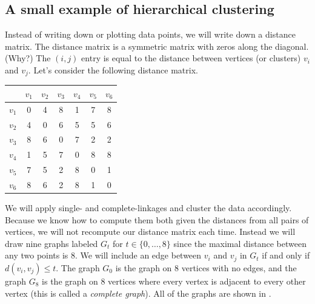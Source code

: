 \documentclass[a4paper, 12pt]{article}
\numberwithin{equation}{section}
\numberwithin{figure}{section}
\theoremstyle{definition}
\renewcommand{\leq}{\leqslant}
\begin{document}
\subsection{A small example of hierarchical clustering}

Instead of writing down or plotting data points, we will write down a distance
matrix. The distance matrix is a symmetric matrix with zeros along the diagonal.
(Why?) The $(i,j)$ entry is equal to the distance between vertices (or clusters)
$v_i$ and $v_j$. Let's consider the following distance matrix.
\begin{center}
	\begin{tabular}{c|cccccc}
		& $v_1$ & $v_2$ & $v_3$ & $v_4$ & $v_5$ & $v_6$ \\ \hline 
		$v_1$ & 0 & 4 & 8 & 1 & 7 & 8 \\
		$v_2$ & 4 & 0 & 6 & 5 & 5 & 6 \\
		$v_3$ & 8 & 6 & 0 & 7 & 2 & 2 \\
		$v_4$ & 1 & 5 & 7 & 0 & 8 & 8 \\
		$v_5$ & 7 & 5 & 2 & 8 & 0 & 1 \\
		$v_6$ & 8 & 6 & 2 & 8 & 1 & 0 
	\end{tabular}
\end{center}

We will apply single- and complete-linkages and cluster the data accordingly.
Because we know how to compute them both given the distances from all pairs of
vertices, we will not recompute our distance matrix each time. Instead we will
draw nine graphs labeled $G_t$ for $t\in \{0, \dots, 8\}$ since the maximal
distance between any two points is $8$. We will include an edge between $v_i$
and $v_j$ in $G_t$ if and only if $d(v_i, v_j)\leq t$. The graph $G_0$ is the
graph on 8 vertices with no edges, and the graph $G_8$ is the graph on 8
vertices where every vertex is adjacent to every other vertex (this is called a
\emph{complete graph}). All of the graphs are shown in .
\end{document}
